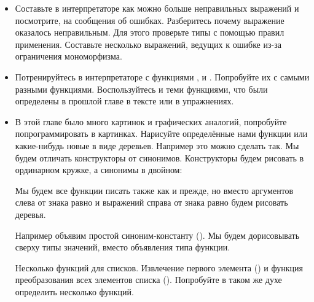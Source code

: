 \begin{itemize}

\item Составьте в интерпретаторе как можно больше
    неправильных выражений и посмотрите, на сообщения об ошибках.
    Разберитесь почему выражение оказалось неправильным.
    Для этого проверьте типы с помощью правил применения.
    Составьте несколько выражений, ведущих к ошибке
    из-за ограничения мономорфизма.




\item Потренируйтесь в интерпретаторе 
с функциями ,  и .
Попробуйте их с самыми разными функциями. Воспользуйтесь
и теми функциями, что были определены в прошлой главе
в тексте или в упражнениях. 

\item В этой главе было много картинок и графических аналогий, 
попробуйте попрограммировать в картинках. Нарисуйте 
определённые нами функции или какие-нибудь новые в
виде деревьев. Например это можно сделать так.
Мы будем отличать конструкторы от синонимов. Конструкторы
будем рисовать в ординарном кружке, а синонимы в двойном:

Мы будем все функции писать также как и прежде, но 
вместо аргументов слева от знака равно и выражений
справа от знака равно будем рисовать деревья. 

Например объявим простой синоним-константу ().
Мы будем дорисовывать сверху типы значений, вместо объявления типа
функции.

Несколько функций для списков. Извлечение первого элемента 
() и функция преобразования всех элементов списка 
().
Попробуйте в таком же духе определить несколько функций.

\end{itemize}


